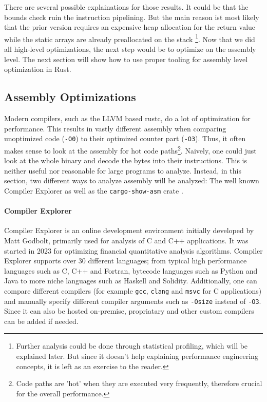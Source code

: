 There are several possible explainations for those results. It could be that the bounds check ruin the instruction pipelining. But the main reason ist most likely that the prior version requires an expensive heap allocation for the return value while the static arrays are already preallocated on the stack \footnote{Further analysis could be done through statistical profiling, which will be explained later. But since it doesn't help explaining performance engineering concepts, it is left as an exercise to the reader.}. Now that we did all high-level optimizations, the next step would be to optimize on the assembly level. The next section will show how to use proper tooling for assembly level optimization in Rust.

\subsection{Assembly Optimizations}
Modern compilers, such as the \ac{LLVM} based rustc, do a lot of optimization for performance. This results in vastly different assembly when comparing unoptimized code (\texttt{-O0}) to their optimized counter part (\texttt{-O3}). Thus, it often makes sense to look at the assembly for hot code paths\footnote{Code paths are 'hot' when they are executed very frequently, therefore crucial for the overall performance.}. Naively, one could just look at the whole binary and decode the bytes into their instructions. This is neither useful nor reasonable for large programs to analyze. Instead, in this section, two different ways to analyze assembly will be analyzed: The well known Compiler Explorer \cite{compilerexplorer} as well as the \texttt{cargo-show-asm} crate \cite{cargoshowasm}.

\paragraph{Compiler Explorer}

Compiler Explorer \cite{compilerexplorer} is an online development environment initially developed by Matt Godbolt, primarily used for analysis of C and C++ applications. It was started in 2023 for optimizing financial quantitative analysis algorithms. Compiler Explorer supports over 30 different languages; from typical high performance languages such as C, C++ and Fortran, bytecode languages such as Python and Java to more niche languages such as Haskell and Solidity. Additionally, one can compare different compilers (for example \texttt{gcc}, \texttt{clang} and \texttt{msvc} for C applications) and manually specify different compiler arguments such as \texttt{-Osize} instead of \texttt{-O3}. Since it can also be hosted on-premise, propriatary and other custom compilers can be added if needed.

